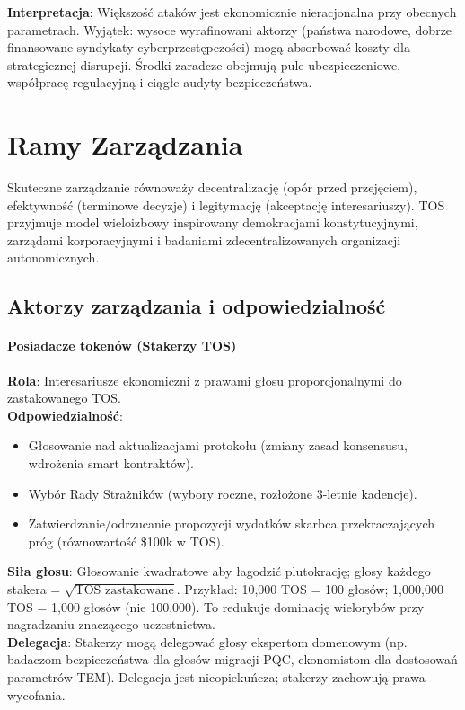 \documentclass[11pt]{article}
\begin{document}
\textbf{Interpretacja}: Większość ataków jest ekonomicznie nieracjonalna przy obecnych parametrach. Wyjątek: wysoce wyrafinowani aktorzy (państwa narodowe, dobrze finansowane syndykaty cyberprzestępczości) mogą absorbować koszty dla strategicznej disrupcji. Środki zaradcze obejmują pule ubezpieczeniowe, współpracę regulacyjną i ciągłe audyty bezpieczeństwa.

\section{Ramy Zarządzania}
\label{sec:governance}

Skuteczne zarządzanie równoważy decentralizację (opór przed przejęciem), efektywność (terminowe decyzje) i legitymację (akceptację interesariuszy). TOS przyjmuje model wieloizbowy inspirowany demokracjami konstytucyjnymi, zarządami korporacyjnymi i badaniami zdecentralizowanych organizacji autonomicznych.

\subsection{Aktorzy zarządzania i odpowiedzialność}

\paragraph{Posiadacze tokenów (Stakerzy TOS)}
\textbf{Rola}: Interesariusze ekonomiczni z prawami głosu proporcjonalnymi do zastakowanego TOS.\\
\textbf{Odpowiedzialność}:
\begin{itemize}[noitemsep]
  \item Głosowanie nad aktualizacjami protokołu (zmiany zasad konsensusu, wdrożenia smart kontraktów).
  \item Wybór Rady Strażników (wybory roczne, rozłożone 3-letnie kadencje).
  \item Zatwierdzanie/odrzucanie propozycji wydatków skarbca przekraczających próg (równowartość \$100k w TOS).
\end{itemize}
\textbf{Siła głosu}: Głosowanie kwadratowe aby łagodzić plutokrację; głosy każdego stakera = $\sqrt{\text{TOS zastakowane}}$. Przykład: 10,000 TOS = 100 głosów; 1,000,000 TOS = 1,000 głosów (nie 100,000). To redukuje dominację wielorybów przy nagradzaniu znaczącego uczestnictwa.\\
\textbf{Delegacja}: Stakerzy mogą delegować głosy ekspertom domenowym (np. badaczom bezpieczeństwa dla głosów migracji PQC, ekonomistom dla dostosowań parametrów TEM). Delegacja jest nieopiekuńcza; stakerzy zachowują prawa wycofania.
\end{document}
